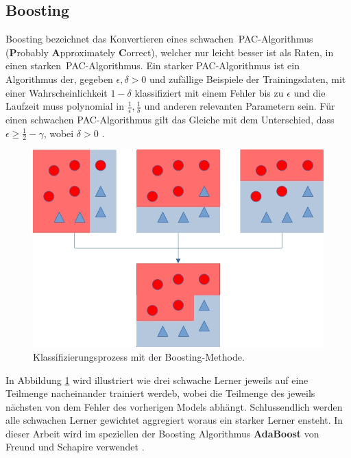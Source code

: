 \subsection{Boosting}
Boosting bezeichnet das Konvertieren eines \glqq schwachen\grqq\ PAC-Algorithmus (\textbf{P}robably \textbf{A}pproximately \textbf{C}orrect), welcher nur leicht besser ist als Raten, in einen \glqq starken\grqq\
PAC-Algorithmus. Ein starker PAC-Algorithmus ist ein Algorithmus der, gegeben $\epsilon, \delta > 0$ und zufällige Beispiele der Trainingsdaten, mit einer Wahrscheinlichkeit $1 - \delta$
klassifiziert mit einem Fehler bis zu $\epsilon$ und die Laufzeit muss polynomial in $\frac{1}{\epsilon}, \frac{1}{\delta}$ und anderen relevanten Parametern sein. Für einen schwachen PAC-Algorithmus gilt das Gleiche
mit dem Unterschied, dass $\epsilon \geq \frac{1}{2} - \gamma$, wobei $\delta > 0$ \cite{freund1997decision}.
\newline
\newline
\begin{figure}
    \centering
    \includegraphics[width=0.6\linewidth]{images/boosting.jpg}
    \caption{Klassifizierungsprozess mit der Boosting-Methode.}
    \label{fig:boosting}
\end{figure}
In Abbildung \ref{fig:boosting} wird illustriert wie drei schwache Lerner jeweils auf eine Teilmenge nacheinander trainiert werdeb, wobei die Teilmenge des jeweils nächsten von dem Fehler des vorherigen Models abhängt.
Schlussendlich werden alle schwachen Lerner gewichtet aggregiert woraus ein starker Lerner ensteht. In dieser Arbeit wird im speziellen der Boosting Algorithmus \textbf{AdaBoost} von Freund und Schapire verwendet \cite{freund1997decision}.